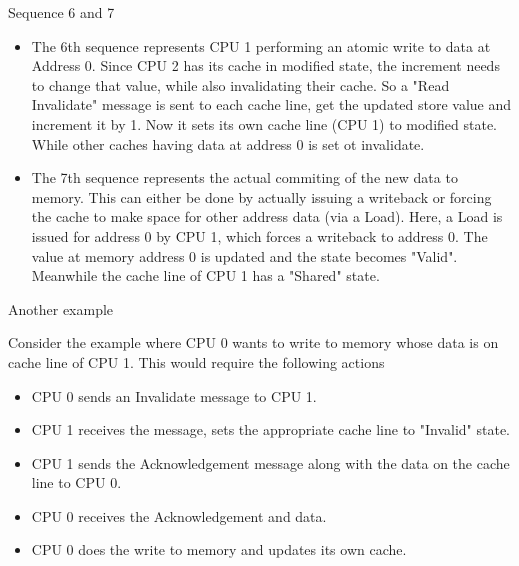 \documentclass[notes, xcolor = dvipsnames]{beamer}
\begin{document}
    \begin{frame}{Sequence 6 and 7}

        \begin{itemize}
            \item The 6th sequence represents CPU 1 performing an atomic write to data at Address 0.
                Since CPU 2 has its cache in modified state, the increment needs to change that value, while also invalidating their cache. 
                So a "Read Invalidate" message is sent to each cache line, get the updated store value and increment it by 1.
                Now it sets its own cache line (CPU 1) to modified state. 
                While other caches having data at address 0 is set ot invalidate. 
            \item The 7th sequence represents the actual commiting of the new data to memory. 
                This can either be done by actually issuing a writeback or forcing the cache to make space for other address data (via a Load).
                Here, a Load is issued for address 0 by CPU 1, which forces a writeback to address 0.
                The value at memory address 0 is updated and the state becomes "Valid".
                Meanwhile the cache line of CPU 1 has a "Shared" state.
        \end{itemize}
        
    \end{frame}


    \begin{frame}{Another example}

        Consider the example where CPU 0 wants to write to memory whose data is on cache line of CPU 1. 
        This would require the following actions
        \begin{itemize}
            \item CPU 0 sends an Invalidate message to CPU 1.
            \item CPU 1 receives the message, sets the appropriate cache line to "Invalid" state.
            \item CPU 1 sends the Acknowledgement message along with the data on the cache line to CPU 0.
            \item CPU 0 receives the Acknowledgement and data.
            \item CPU 0 does the write to memory and updates its own cache. 
        \end{itemize}

    \end{frame}
\end{document}
